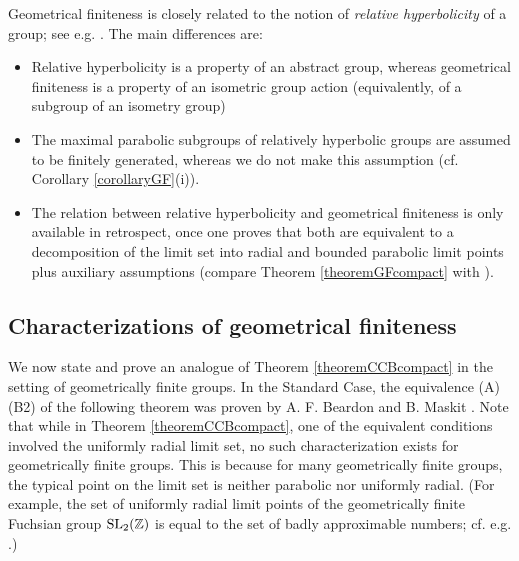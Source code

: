 \begin{remark}
Geometrical finiteness is closely related to the notion of \emph{relative hyperbolicity} of a group; see e.g. \cite{Bowditch_relatively_hyperbolic}. The main differences are:
\begin{itemize}
\item[1.] Relative hyperbolicity is a property of an abstract group, whereas geometrical finiteness is a property of an isometric group action (equivalently, of a subgroup of an isometry group)
\item[2.] The maximal parabolic subgroups of relatively hyperbolic groups are assumed to be finitely generated, whereas we do not make this assumption (cf. Corollary \ref{corollaryGF}(i)).
\item[3.] The relation between relative hyperbolicity and geometrical finiteness is only available in retrospect, once one proves that both are equivalent to a decomposition of the limit set into radial and bounded parabolic limit points plus auxiliary assumptions (compare Theorem \ref{theoremGFcompact} with \cite[Definition 1]{Bowditch_relatively_hyperbolic}).
\end{itemize}
\end{remark}

\subsection{Characterizations of geometrical finiteness}
We now state and prove an analogue of Theorem \ref{theoremCCBcompact} in the setting of geometrically finite groups. In the Standard Case, the equivalence (A) \iff (B2) of the following theorem was proven by A. F. Beardon and B. Maskit \cite{BeardonMaskit}. Note that while in Theorem \ref{theoremCCBcompact}, one of the equivalent conditions involved the uniformly radial limit set, no such characterization exists for geometrically finite groups. This is because for many geometrically finite groups, the typical point on the limit set is neither parabolic nor uniformly radial. (For example, the set of uniformly radial limit points of the geometrically finite Fuchsian group $\SL_2(\Z)$ is equal to the set of badly approximable numbers; cf. e.g. \cite[Observation 1.15 and Proposition 1.21]{FSU4}.)

